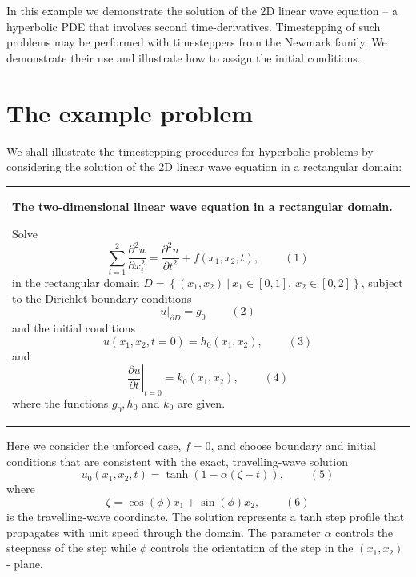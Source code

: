 In this example we demonstrate the solution of the 2D linear wave equation -- a hyperbolic P\+DE that involves second time-\/derivatives. Timestepping of such problems may be performed with timesteppers from the {\ttfamily Newmark} family. We demonstrate their use and illustrate how to assign the initial conditions.



 

\hypertarget{index_example_problem}{}\section{The example problem}\label{index_example_problem}
We shall illustrate the timestepping procedures for hyperbolic problems by considering the solution of the 2D linear wave equation in a rectangular domain\+:

\begin{center} \tabulinesep=1mm
\begin{longtabu} spread 0pt [c]{*{1}{|X[-1]}|}
\hline
\begin{center} {\bfseries The two-\/dimensional linear wave equation in a rectangular domain.} \end{center}  Solve \[ \sum_{i=1}^2\frac{\partial^2 u}{\partial x_i^2} = \frac{\partial^2 u}{\partial t^2} + f\left(x_1,x_2,t\right), \ \ \ \ \ \ \ \ \ \ (1) \] in the rectangular domain $ D = \left\{ (x_1,x_2) \ \bigg| \ x_1 \in [0,1],\ x_2 \in [0,2] \right\} $, subject to the Dirichlet boundary conditions \[ \left. u\right|_{\partial D}=g_0 \ \ \ \ \ \ \ \ \ \ (2) \] and the initial conditions \[ u(x_1,x_2,t=0)=h_0(x_1,x_2), \ \ \ \ \ \ \ \ \ \ (3) \] and \[ \left. \frac{\partial u}{\partial t}\right|_{t=0}=k_0(x_1,x_2), \ \ \ \ \ \ \ \ \ \ (4) \] where the functions $ g_0, h_0$ and $ k_0 $ are given.   \\
\end{longtabu}
\end{center} 

Here we consider the unforced case, $ f=0 $, and choose boundary and initial conditions that are consistent with the exact, travelling-\/wave solution \[ u_0(x_1,x_2,t) = \tanh\left(1-\alpha\left(\zeta-t\right)\right), \ \ \ \ \ \ \ \ \ \ (5) \] where \[ \zeta=\cos\left(\phi\right)x_1+\sin\left(\phi\right)x_2, \ \ \ \ \ \ \ \ \ \ (6) \] is the travelling-\/wave coordinate. The solution represents a tanh step profile that propagates with unit speed through the domain. The parameter $ \alpha $ controls the steepness of the step while $ \phi $ controls the orientation of the step in the $ (x_1,x_2) $ -\/ plane.

